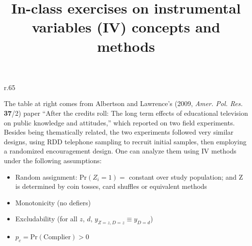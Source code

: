 \documentclass{article}
\title{In-class exercises on instrumental variables (IV) concepts and methods }
\begin{document}
\maketitle

\begin{minipage}{1.0\linewidth}

\begin{wrapfigure}{r}{.65\linewidth}
\end{wrapfigure}

The table at right comes from Albertson and Lawrence's (2009, \textit{Amer. Pol. Res.} \textbf{37}/2) paper ``After the credits roll: The long term effects of educational television on public knowledge and attitudes,'' which reported on two field experiments.   Besides being thematically related, the two experiments followed very similar designs, using RDD telephone sampling to recruit initial samples, then employing a randomized encouragement design.  One can analyze them using IV methods under the following assumptions:

\begin{itemize}
\item Random assignment: $\mathrm{Pr}(Z_{i}=1) = $ constant over study population;  and $\mathrm{Z} $ is determined by coin tosses, card shuffles or equivalent methods
\item Monotonicity (no defiers)
\item Excludability (for all $z$, $d$, $y_{Z=z, D=z} \equiv y_{D=d}$)
\item $p_{c} = \mathrm{Pr}(\mathrm{Complier}) > 0$ 
\end{itemize}
  
\end{minipage}
\vspace{4ex}
\end{document}
